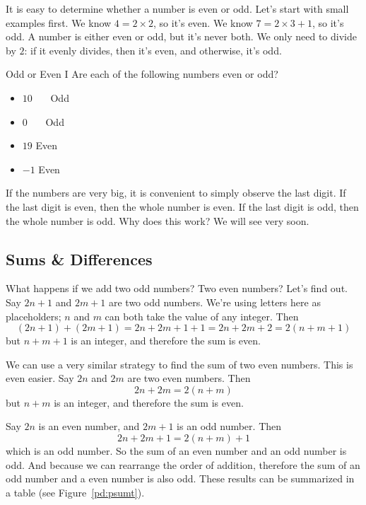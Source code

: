 \documentclass[a4paper,10pt]{report}
\begin{document}
It is easy to determine whether a number is even or odd. Let's start with small
examples first. We know \(4=2\times2\), so it's even. We know \(7=2\times3+1\),
so it's odd. A number is either even or odd, but it's never both. We only need
to divide by \(2\): if it evenly divides, then it's even, and otherwise, it's
odd.

\begin{problem}{Odd or Even I}
 Are each of the following numbers even or odd?

 \begin{itemize}
  \item \(10\) \hfill {}~~~Odd
  \item \(0\) \hfill {}~~~Odd
  \item \(19\) \hfill Even~~~
  \item \(-1\) \hfill Even~~~
 \end{itemize}
\end{problem}

If the numbers are very big, it is convenient to simply observe the last digit.
If the last digit is even, then the whole number is even. If the last digit is
odd, then the whole number is odd. Why does this work? We will see very soon.

\subsection{Sums \& Differences}

What happens if we add two odd numbers? Two even numbers? Let's find out. Say
\(2n+1\) and \(2m+1\) are two odd numbers. We're using letters here as
placeholders; \(n\) and \(m\) can both take the value of any integer. Then \[
(2n+1) + (2m+1) = 2n + 2m + 1 + 1 = 2n + 2m + 2 = 2(n+m+1) \] but \(n+m+1\) is
an integer, and therefore the sum is even.

We can use a very similar strategy to find the sum of two even numbers. This is
even easier. Say \(2n\) and \(2m\) are two even numbers. Then \[
 2n + 2m = 2(n+m)
\] but \(n+m\) is an integer, and therefore the sum is even.

Say \(2n\) is an even number, and \(2m+1\) is an odd number. Then \[
 2n + 2m + 1 = 2(n+m) + 1
\] which is an odd number. So the sum of an even number and an odd number is
odd. And because we can rearrange the order of addition, therefore the sum of an
odd number and a even number is also odd. These results can be summarized in a
table (see Figure~\ref{pd:psumt}).
\end{document}
